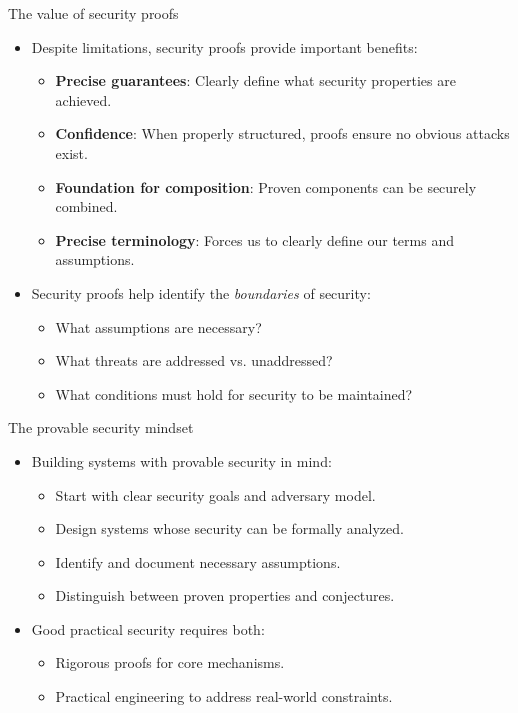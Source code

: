 \documentclass[aspectratio=169, lualatex, handout]{beamer}
\begin{document}
\begin{frame}{The value of security proofs}
	\begin{itemize}[<+->]
		\item Despite limitations, security proofs provide important benefits:
		      \begin{itemize}[<+->]
			      \item \textbf{Precise guarantees}: Clearly define what security properties are achieved.
			      \item \textbf{Confidence}: When properly structured, proofs ensure no obvious attacks exist.
			      \item \textbf{Foundation for composition}: Proven components can be securely combined.
			      \item \textbf{Precise terminology}: Forces us to clearly define our terms and assumptions.
		      \end{itemize}
		\item Security proofs help identify the \textit{boundaries} of security:
		      \begin{itemize}[<+->]
			      \item What assumptions are necessary?
			      \item What threats are addressed vs. unaddressed?
			      \item What conditions must hold for security to be maintained?
		      \end{itemize}
	\end{itemize}
\end{frame}

\begin{frame}{The provable security mindset}
	\begin{itemize}[<+->]
		\item Building systems with provable security in mind:
		      \begin{itemize}[<+->]
			      \item Start with clear security goals and adversary model.
			      \item Design systems whose security can be formally analyzed.
			      \item Identify and document necessary assumptions.
			      \item Distinguish between proven properties and conjectures.
		      \end{itemize}
		\item Good practical security requires both:
		      \begin{itemize}[<+->]
			      \item Rigorous proofs for core mechanisms.
			      \item Practical engineering to address real-world constraints.
		      \end{itemize}
	\end{itemize}
\end{frame}
\end{document}
